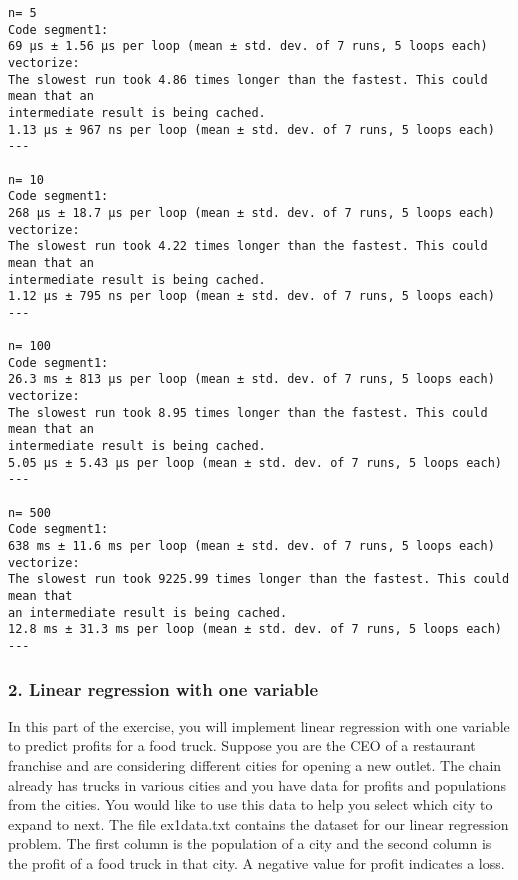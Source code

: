 \documentclass[11pt]{article}
\begin{document}
    \begin{Verbatim}[commandchars=\\\{\}]
n= 5
Code segment1:
69 µs ± 1.56 µs per loop (mean ± std. dev. of 7 runs, 5 loops each)
vectorize:
The slowest run took 4.86 times longer than the fastest. This could mean that an
intermediate result is being cached.
1.13 µs ± 967 ns per loop (mean ± std. dev. of 7 runs, 5 loops each)
---

n= 10
Code segment1:
268 µs ± 18.7 µs per loop (mean ± std. dev. of 7 runs, 5 loops each)
vectorize:
The slowest run took 4.22 times longer than the fastest. This could mean that an
intermediate result is being cached.
1.12 µs ± 795 ns per loop (mean ± std. dev. of 7 runs, 5 loops each)
---

n= 100
Code segment1:
26.3 ms ± 813 µs per loop (mean ± std. dev. of 7 runs, 5 loops each)
vectorize:
The slowest run took 8.95 times longer than the fastest. This could mean that an
intermediate result is being cached.
5.05 µs ± 5.43 µs per loop (mean ± std. dev. of 7 runs, 5 loops each)
---

n= 500
Code segment1:
638 ms ± 11.6 ms per loop (mean ± std. dev. of 7 runs, 5 loops each)
vectorize:
The slowest run took 9225.99 times longer than the fastest. This could mean that
an intermediate result is being cached.
12.8 ms ± 31.3 ms per loop (mean ± std. dev. of 7 runs, 5 loops each)
---

\end{Verbatim}

    \hypertarget{linear-regression-with-one-variable}{%
\subsubsection{2. Linear regression with one
variable}\label{linear-regression-with-one-variable}}

In this part of the exercise, you will implement linear regression with
one variable to predict profits for a food truck. Suppose you are the
CEO of a restaurant franchise and are considering different cities for
opening a new outlet. The chain already has trucks in various cities and
you have data for profits and populations from the cities. You would
like to use this data to help you select which city to expand to next.
The file ex1data.txt contains the dataset for our linear regression
problem. The first column is the population of a city and the second
column is the profit of a food truck in that city. A negative value for
profit indicates a loss.
\end{document}
